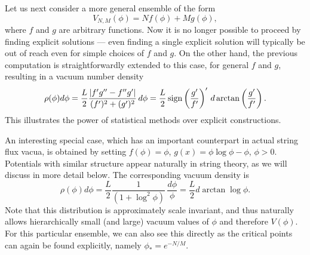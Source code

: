 \documentclass[aps,amsfonts]{ar2e}
\begin{document}
Let us next consider a more general ensemble of the form
\begin{equation}
 V_{N,M}(\phi) = N f(\phi) + M g(\phi),
\end{equation}
where $f$ and $g$ are arbitrary functions. Now it is no longer
possible to proceed by finding explicit solutions --- even finding a
single explicit solution will typically be out of reach even for
simple choices of $f$ and $g$. On the other hand, the previous
computation is straightforwardly extended to this case, for general
$f$ and $g$, resulting in a vacuum number density
\begin{equation}
 \rho(\phi) d\phi = \frac{L}{2} \frac{|f' g'' - f'' g'|}{(f')^2 + (g')^2}
 \, d\phi
 = \frac{L}{2} \, {\rm sign}\left(\frac{g'}{f'}\right)' \, d \arctan \left( \frac{g'}{f'} \right).
\end{equation}
This illustrates the power of statistical methods over explicit
constructions.

An interesting special case, which has an important counterpart in
actual string flux vacua, is obtained by setting $f(\phi)=\phi$,
$g(x)=\phi \log \phi - \phi$, $\phi>0$.
Potentials with similar structure appear naturally in string theory,
as we will discuss in more detail below.  The corresponding vacuum
density is
\begin{equation} \label{scalinv}
 \rho(\phi) d\phi = \frac{L}{2} \frac{1}{(1+ \log^2 \phi)}
   \, \frac{d\phi}{\phi} =
 \frac{L}{2} d \arctan \log \phi.
\end{equation}
Note that this distribution is approximately scale invariant, and
thus naturally allows hierarchically small (and large) vacuum values
of $\phi$ and therefore $V(\phi)$. For this particular ensemble, we
can also see this directly as the critical points can again be found
explicitly, namely $\phi_* = e^{-N/M}$.

\end{document}
